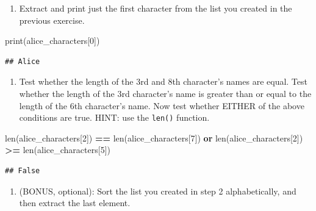 \documentclass[
]{book}
\newenvironment{Shaded}{\begin{snugshade}}{\end{snugshade}}
\newcommand{\BuiltInTok}[1]{#1}
\newcommand{\DecValTok}[1]{\textcolor[rgb]{0.00,0.00,0.81}{#1}}
\newcommand{\KeywordTok}[1]{\textcolor[rgb]{0.13,0.29,0.53}{\textbf{#1}}}
\newcommand{\NormalTok}[1]{#1}
\newcommand{\OperatorTok}[1]{\textcolor[rgb]{0.81,0.36,0.00}{\textbf{#1}}}
\providecommand{\tightlist}{%
  \setlength{\itemsep}{0pt}\setlength{\parskip}{0pt}}
\begin{document}
\begin{enumerate}
\def\labelenumi{\arabic{enumi}.}
\setcounter{enumi}{1}
\tightlist
\item
  Extract and print just the first character from the list you created in the previous exercise.
\end{enumerate}

\begin{Shaded}
\begin{Highlighting}[]
\BuiltInTok{print}\NormalTok{(alice\_characters[}\DecValTok{0}\NormalTok{])}
\end{Highlighting}
\end{Shaded}

\begin{verbatim}
## Alice
\end{verbatim}

\begin{enumerate}
\def\labelenumi{\arabic{enumi}.}
\setcounter{enumi}{2}
\tightlist
\item
  Test whether the length of the 3rd and 8th character's names are equal. Test whether the length of
  the 3rd character's name is greater than or equal to the length of the 6th character's name. Now test
  whether EITHER of the above conditions are true. HINT: use the \texttt{len()} function.
\end{enumerate}

\begin{Shaded}
\begin{Highlighting}[]
\BuiltInTok{len}\NormalTok{(alice\_characters[}\DecValTok{2}\NormalTok{]) }\OperatorTok{==} \BuiltInTok{len}\NormalTok{(alice\_characters[}\DecValTok{7}\NormalTok{]) }\KeywordTok{or} \BuiltInTok{len}\NormalTok{(alice\_characters[}\DecValTok{2}\NormalTok{]) }\OperatorTok{\textgreater{}=} \BuiltInTok{len}\NormalTok{(alice\_characters[}\DecValTok{5}\NormalTok{])}
\end{Highlighting}
\end{Shaded}

\begin{verbatim}
## False
\end{verbatim}

\begin{enumerate}
\def\labelenumi{\arabic{enumi}.}
\setcounter{enumi}{3}
\tightlist
\item
  (BONUS, optional): Sort the list you created in step 2 alphabetically,
  and then extract the last element.
\end{enumerate}
\end{document}
